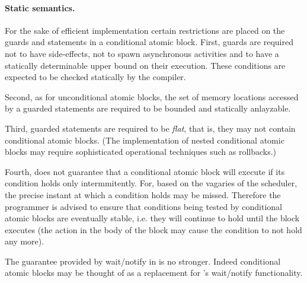 \paragraph{Static semantics.}
For the sake of efficient implementation certain restrictions are
placed on the guards and statements in a conditional atomic
block. First, guards are required not to have side-effects, not to
spawn asynchronous activities and to have a statically determinable
upper bound on their execution. These conditions are expected to
be checked statically by the compiler.

Second, as for unconditional atomic blocks, the set of memory
locations accessed by a guarded statements are required to be bounded
and statically anlayzable.

Third, guarded statements are required to be {\em flat}, that is, they
may not contain conditional atomic blocks. (The implementation of
nested conditional atomic blocks may require sophisticated
operational techniques such as rollbacks.)

Fourth, \Xten{} does not guarantee that a conditional atomic block
will execute if its condition holds only intermmitently. For, based on
the vagaries of the scheduler, the precise instant at which a
condition holds may be missed. Therefore the programmer is advised to
ensure that conditions being tested by conditional atomic blocks are
eventually stable, i.e.{} they will continue to hold until the block
executes (the action in the body of the block may cause the condition
to not hold any more).


\begin{rationale}
The guarantee provided by {\cf wait/notify} in \java{} is no
stronger. Indeed conditional atomic blocks may be thought of as a
replacement for \java's wait/notify functionality.
\end{rationale} 

